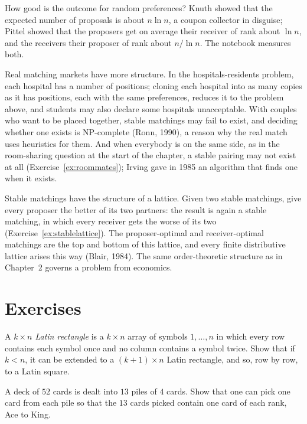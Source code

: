 How good is the outcome for random preferences? Knuth showed that the expected number of proposals is about $n\ln n$, a coupon
collector in disguise; Pittel showed that the proposers get on average their receiver of rank about $\ln n$, and the receivers their
proposer of rank about $n/\ln n$. The notebook measures both.

Real matching markets have more structure. In the hospitals-residents problem, each hospital has a number of positions; cloning
each hospital into as many copies as it has positions, each with the same preferences, reduces it to the problem above, and
students may also declare some hospitals unacceptable. With couples who want to be placed together, stable matchings may fail to
exist, and deciding whether one exists is NP-complete (Ronn, 1990), a reason why the real match uses heuristics for them. And when
everybody is on the same side, as in the room-sharing question at the start of the chapter, a stable pairing may not exist at all
(Exercise~\ref{ex:roommates}); Irving gave in 1985 an algorithm that finds one when it exists.

\begin{beauty}
Stable matchings have the structure of a lattice. Given two stable matchings, give every proposer the better of its two partners:
the result is again a stable matching, in which every receiver gets the worse of its two (Exercise~\ref{ex:stablelattice}). The
proposer-optimal and receiver-optimal matchings are the top and bottom of this lattice, and every finite distributive lattice
arises this way (Blair, 1984). The same order-theoretic structure as in Chapter~2 governs a problem from economics.
\end{beauty}

\section{Exercises}

\begin{exercise}[$\star\star$]\label{ex:latin}
A \emph{$k\times n$ Latin rectangle} is a $k\times n$ array of symbols $1,\dots,n$ in which every row contains each symbol once and no column contains a
symbol twice. Show that if $k<n$, it can be extended to a $(k+1)\times n$ Latin rectangle, and so, row by row, to a Latin square.
\end{exercise}

\begin{exercise}[$\star$]\label{ex:cards}
A deck of $52$ cards is dealt into $13$ piles of $4$ cards. Show that one can pick one card from each pile so that the $13$ cards picked
contain one card of each rank, Ace to King.
\end{exercise}


